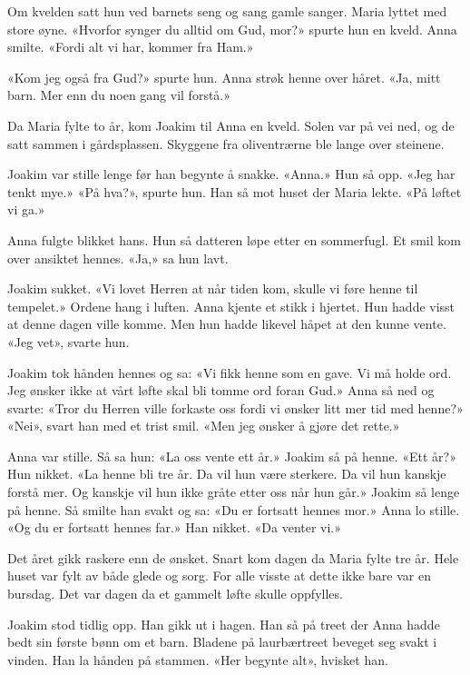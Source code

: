 Om kvelden satt hun ved barnets seng og sang gamle sanger.
Maria lyttet med store øyne.
«Hvorfor synger du alltid om Gud, mor?» spurte hun en kveld.
Anna smilte. «Fordi alt vi har, kommer fra Ham.»

«Kom jeg også fra Gud?» spurte hun.
Anna strøk henne over håret.
«Ja, mitt barn. Mer enn du noen gang vil forstå.»



Da Maria fylte to år, kom Joakim til Anna en kveld.
Solen var på vei ned, og de satt sammen i gårdsplassen.
Skyggene fra oliventrærne ble lange over steinene.

Joakim var stille lenge før han begynte å snakke.
«Anna.» Hun så opp. «Jeg har tenkt mye.»
«På hva?», spurte hun.
Han så mot huset der Maria lekte.
«På løftet vi ga.»

Anna fulgte blikket hans.
Hun så datteren løpe etter en sommerfugl.
Et smil kom over ansiktet hennes.
«Ja,» sa hun lavt.

Joakim sukket.
«Vi lovet Herren at når tiden kom, skulle vi føre henne til tempelet.»
Ordene hang i luften.
Anna kjente et stikk i hjertet.
Hun hadde visst at denne dagen ville komme.
Men hun hadde likevel håpet at den kunne vente.
«Jeg vet», svarte hun.

Joakim tok hånden hennes og sa:
«Vi fikk henne som en gave. Vi må holde ord.
Jeg ønsker ikke at vårt løfte skal bli tomme ord foran Gud.»
Anna så ned og svarte:
«Tror du Herren ville forkaste oss fordi vi ønsker litt mer tid med henne?»
«Nei», svart han med et trist smil.
«Men jeg ønsker å gjøre det rette.»

Anna var stille. Så sa hun:
«La oss vente ett år.»
Joakim så på henne. «Ett år?»
Hun nikket.
«La henne bli tre år. Da vil hun være sterkere.
Da vil hun kanskje forstå mer. Og kanskje vil hun ikke
gråte etter oss når hun går.»
Joakim så lenge på henne.
Så smilte han svakt og sa:
«Du er fortsatt hennes mor.»
Anna lo stille.
«Og du er fortsatt hennes far.»
Han nikket.
«Da venter vi.»

Det året gikk raskere enn de ønsket.
Snart kom dagen da Maria fylte tre år.
Hele huset var fylt av både glede og sorg.
For alle visste at dette ikke bare var en bursdag.
Det var dagen da et gammelt løfte skulle oppfylles.

Joakim stod tidlig opp.
Han gikk ut i hagen.
Han så på treet der Anna hadde bedt sin første bønn om et barn.
Bladene på laurbærtreet beveget seg svakt i vinden.
Han la hånden på stammen.
«Her begynte alt», hvisket han.


